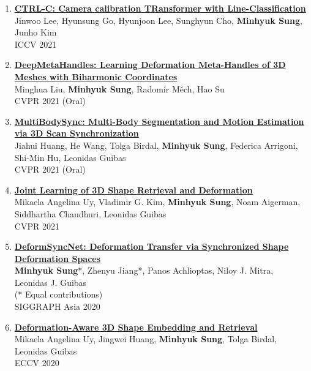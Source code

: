 \documentclass[letterpaper,10pt]{article} %
\newcommand{\blankline}{\quad\pagebreak[2]}
\begin{document}
{{\begin{enumerate}
\item \label{iccv21_1}
\href{https://arxiv.org/abs/2109.02259}{\textbf{CTRL-C: Camera calibration TRansformer with Line-Classification}}\\
Jinwoo Lee, Hyunsung Go, Hyunjoon Lee, Sunghyun Cho, \textbf{Minhyuk Sung}, Junho Kim\\
ICCV 2021\\
\blankline

\item \label{cvpr21_3}
\href{https://mhsung.github.io/papers/deep-meta-handles.html}{\textbf{DeepMetaHandles: Learning Deformation Meta-Handles of 3D Meshes with Biharmonic Coordinates}}\\
Minghua Liu, \textbf{Minhyuk Sung}, Radomír Měch, Hao Su\\
CVPR 2021 (Oral)\\
\blankline

\item \label{cvpr21_2}
\href{https://cg.cs.tsinghua.edu.cn/people/~huangjh/publication/multibodysync/}{\textbf{MultiBodySync: Multi-Body Segmentation and Motion Estimation via 3D Scan Synchronization}}\\
Jiahui Huang, He Wang, Tolga Birdal, \textbf{Minhyuk Sung}, Federica Arrigoni, Shi-Min Hu, Leonidas Guibas\\
CVPR 2021 (Oral)\\
\blankline

\item \label{cvpr21_1}
\href{https://joint-retrieval-deformation.github.io/}{\textbf{Joint Learning of 3D Shape Retrieval and Deformation}}\\
Mikaela Angelina Uy, Vladimir G. Kim, \textbf{Minhyuk Sung}, Noam Aigerman, Siddhartha Chaudhuri, Leonidas Guibas\\
CVPR 2021\\
\blankline

\item \label{siggraphasia20}
\href{https://mhsung.github.io/papers/deform-sync-net.html}{\textbf{DeformSyncNet: Deformation Transfer via Synchronized Shape Deformation Spaces}}\\
\textbf{Minhyuk Sung}*, Zhenyu Jiang*, Panos Achlioptas, Niloy J. Mitra, Leonidas J. Guibas\\
(* Equal contributions)\\
SIGGRAPH Asia 2020\\
\blankline

\item \label{eccv20_4}
\href{https://deformscan2cad.github.io/}{\textbf{Deformation-Aware 3D Shape Embedding and Retrieval}}\\
Mikaela Angelina Uy, Jingwei Huang, \textbf{Minhyuk Sung}, Tolga Birdal, Leonidas Guibas\\
ECCV 2020\\
\blankline


\end{enumerate}}}
\end{document}
